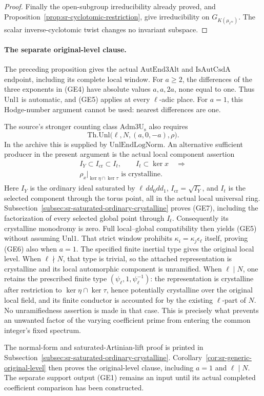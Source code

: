 \begin{proof}
Finally the open-subgroup irreducibility already proved,
and Proposition~\ref{prop:sr-cyclotomic-restriction},
give irreducibility on \(G_{K(\mu_{\ell^\infty})}\).
The scalar inverse-cyclotomic twist changes no invariant
subspace.
\end{proof}

\paragraph{The separate original-level clause.}
The preceding proposition gives the actual
\(\mathrm{AutEnd3Alt}\) and \(\mathrm{IsAutCsdA}\)
endpoint, including its complete local window.
For \(a\ge2\), the differences of the three exponents
in (GE4) have absolute values \(a,a,2a\), none equal
to one. Thus \(\mathrm{Unl1}\) is automatic, and
(GE5) applies at every \(\ell\)-adic place.
For \(a=1\), this Hodge-number argument cannot be used:
nearest differences are one.

The source's stronger counting class
\(\mathrm{Adm3U_s}\) also requires
\[
 \mathrm{Th.Unl}\bigl(\ell,N,(a,0,-a),\rho\bigr).
 \tag{GE6}
\]
In the archive this is supplied by
\(\mathrm{UnlEndLogNorm}\).
An alternative sufficient producer in the present
argument is the actual local component assertion
\[
 \begin{gathered}
 I_Y\subset I_{\mathrm{cr}}\subset I_t,\qquad
 I_t\subset\ker x
 \quad\Longrightarrow\\[-2mm]
 \rho_x|_{\ker\eta\cap\ker\tau}
                         \text{ is crystalline}.
 \end{gathered}
 \tag{GE7}
\]
Here \(I_Y\) is the ordinary ideal saturated by
\(\ell\,dd_0dd_1\), \(I_{\mathrm{cr}}=\sqrt{I_Y}\),
and \(I_t\) is the selected component through the torus
point, all in the actual local universal ring.
Subsection~\ref{subsec:sr-saturated-ordinary-crystalline} proves
(GE7), including the factorization of every selected global
point through \(I_t\). Consequently
its crystalline monodromy is zero.
Full local--global compatibility then yields (GE5)
without assuming \(\mathrm{Unl1}\).
That strict window prohibits
\(\kappa_i=\kappa_j\epsilon_\ell\) itself, proving
(GE6) also when \(a=1\).
The specified finite inertial type gives the original
local level.
When \(\ell\nmid N\), that type is trivial,
so the attached representation is crystalline and its
local automorphic component is unramified.
When \(\ell\mid N\), one retains the prescribed
finite type \((\psi_\ell,1,\psi_\ell^{-1})\):
the representation is crystalline after restriction to
\(\ker\eta\cap\ker\tau\), hence potentially crystalline
over the original local field, and its finite conductor
is accounted for by the existing \(\ell\)-part of \(N\).
No unramifiedness assertion is made in that case.
This is precisely what prevents an unwanted factor
of the varying coefficient prime from entering the
common integer's fixed spectrum.

The normal-form and saturated-Artinian-lift proof is printed
in Subsection~\ref{subsec:sr-saturated-ordinary-crystalline}.
Corollary~\ref{cor:sr-generic-original-level} then proves the
original-level clause, including \(a=1\) and \(\ell\mid N\).
The separate support output (GE1) remains an input until its
actual completed coefficient comparison has been constructed.
